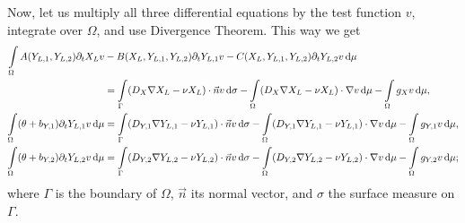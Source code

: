\documentclass[11pt]{article}
\numberwithin{equation}{section}
\begin{document}
Now, let us multiply all three differential equations by the test function \(v\), integrate over \(\Omega\), and use Divergence Theorem. This way we get
\begin{subequations}
\begin{align}
    \int\limits_\Omega
    A(Y_{L,1}, Y_{L,2}) \partial_t X_L v &- B(X_L, Y_{L,1}, Y_{L,2}) \partial_t Y_{L,1} v - C(X_L, Y_{L,1}, Y_{L,2}) \partial_t Y_{L,2} v \dif \mu 
    \notag
    \\
    &=
    \int\limits_\Gamma
    (D_X \nabla X_L - \nu X_L) \cdot \vec{n} v
    \dif \sigma
    -\int\limits_\Omega
    (D_X \nabla X_L - \nu X_L) \cdot \nabla v  \dif \mu
    -\int\limits_\Omega g_X v \dif \mu,
    \\
    \int\limits_\Omega (\theta + b_{Y,1}) \partial_t Y_{L,1} v \dif \mu  &=
    \int\limits_\Gamma (D_{Y,1} \nabla Y_{L,1} - \nu Y_{L,1}) \cdot \vec{n} v \dif\sigma
    -\int\limits_\Omega (D_{Y,1} \nabla Y_{L,1} - \nu Y_{L,1}) \cdot \nabla v \dif\mu - \int\limits_\Omega g_{Y,1} v \dif\mu,
    \\
    \int\limits_\Omega (\theta + b_{Y,2}) \partial_t Y_{L,2} v \dif\mu  &= \int\limits_\Gamma (D_{Y,2} \nabla Y_{L,2} - \nu Y_{L,2}) \cdot \vec{n} v \dif\sigma - 
    \int\limits_\Omega (D_{Y,2} \nabla Y_{L,2} - \nu Y_{L,2}) \cdot \nabla v \dif\mu - \int\limits_\Omega g_{Y,2} v \dif\mu;
\end{align}
\end{subequations}
where $\Gamma$ is the boundary of $\Omega$, $\vec{n}$ its normal vector, and $\sigma$ the surface measure on $\Gamma$. 
\end{document}
